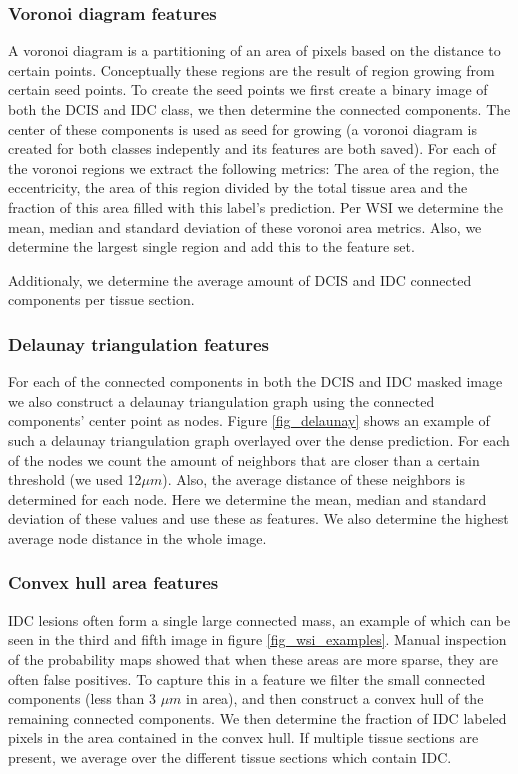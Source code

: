 \documentclass[journal]{IEEEtran}
\begin{document}
\subsubsection{Voronoi diagram features}
A voronoi diagram is a partitioning of an area of pixels based on the distance to certain points. Conceptually these regions are the result of region growing from certain seed points. To create the seed points we first create a binary image of both the DCIS and IDC class, we then determine the connected components. The center of these components is used as seed for growing (a voronoi diagram is created for both classes indepently and its features are both saved). For each of the voronoi regions we extract the following metrics: The area of the region, the eccentricity, the area of this region divided by the total tissue area and the fraction of this area filled with this label's prediction. Per WSI we determine the mean, median and standard deviation of these voronoi area metrics. Also, we determine the largest single region and add this to the feature set.

Additionaly, we determine the average amount of DCIS and IDC connected components per tissue section.

\subsubsection{Delaunay triangulation features}
For each of the connected components in both the DCIS and IDC masked image we also construct a delaunay triangulation graph using the connected components' center point as nodes. Figure \ref{fig_delaunay} shows an example of such a delaunay triangulation graph overlayed over the dense prediction. For each of the nodes we count the amount of neighbors that are closer than a certain threshold (we used 12${\mu}m$). Also, the average distance of these neighbors is determined for each node. Here we determine the mean, median and standard deviation of these values and use these as features. We also determine the highest average node distance in the whole image.

\subsubsection{Convex hull area features}
IDC lesions often form a single large connected mass, an example of which can be seen in the third and fifth image in figure \ref{fig_wsi_examples}. Manual inspection of the probability maps showed that when these areas are more sparse, they are often false positives. To capture this in a feature we filter the small connected components (less than 3 ${\mu}m$ in area), and then construct a convex hull of the remaining connected components. We then determine the fraction of IDC labeled pixels in the area contained in the convex hull. If multiple tissue sections are present, we average over the different tissue sections which contain IDC.
\end{document}

